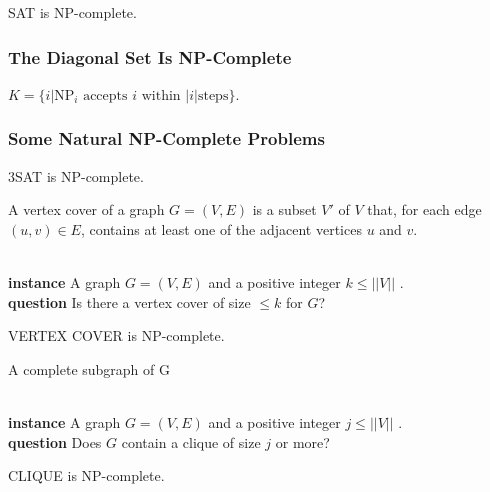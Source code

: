  SAT is NP-complete.

\subsubsection{The Diagonal Set Is NP-Complete}

 $K = \{i | \text{NP}_i \text{ accepts } i \text{ within } |i| \text{
steps}\}$.

\subsubsection{Some Natural NP-Complete Problems}

 3SAT is NP-complete.

 A vertex cover of a graph $G = (V, E)$ is a subset $V'$ of
$V$ that, for each edge $(u, v) \in E$, contains at least one of the
adjacent vertices $u$ and $v$.

\\
\textbf{instance} A graph $G = (V, E)$ and a positive integer $k \le ||V||$ .\\
\textbf{question} Is there a vertex cover of size $\le k$ for $G$?

 VERTEX COVER is NP-complete.

 A complete subgraph of G

 \\
\textbf{instance} A graph $G = (V, E)$ and a positive integer $j \le ||V||$ .\\
\textbf{question} Does $G$ contain a clique of size $j$ or more?

 CLIQUE is NP-complete.
